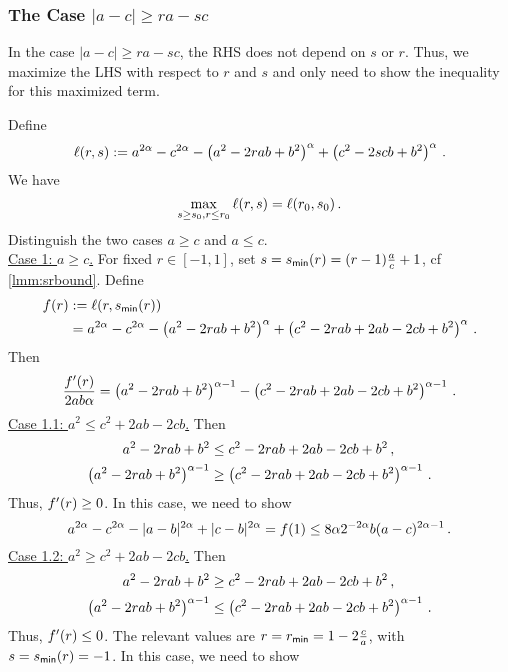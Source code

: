 \subsubsection{The Case $|a-c| \geq ra-sc$}\label{ssec:acgreasc}
%
In the case $|a-c| \geq ra-sc$, the RHS does not depend on $s$ or $r$. Thus, we maximize the LHS with respect to $r$ and $s$ and only need to show the inequality for this maximized term.

Define
\begin{equation*}
	\ell(r,s) := a^{2\alpha}-c^{2\alpha}-\left( a^2-2rab+b^2 \right)^\alpha+\left( c^2-2scb+b^2 \right)^\alpha 
	\, .
\end{equation*}
We have
\begin{equation*}
	\max_{s\geq s_0, r\leq r_0} \ell(r,s) = \ell(r_0,s_0)
	\, .
\end{equation*}
Distinguish the two cases $a\geq c$ and $a\leq c$.\\
\underline{Case 1: $a\geq c$.} For fixed $r\in[-1,1]$, set $s = s_{\mathsf{min}}(r) = (r-1) \frac ac+1$, cf \autoref{lmm:srbound}. Define
\begin{align*}
	f(r) &:= \ell(r,s_{\mathsf{min}}(r)) 
	\\&= a^{2\alpha}-c^{2\alpha}-\left( a^2-2rab+b^2 \right)^\alpha+\left( c^2-2rab+2ab-2cb+b^2 \right)^\alpha
	\, .
\end{align*}
Then
\begin{equation*}
	\frac{f^\prime(r)}{2ab\alpha} = \left( a^2-2rab+b^2 \right)^{\alpha-1} - \left( c^2-2rab+2ab-2cb+b^2 \right)^{\alpha-1}
	\, .
\end{equation*}
\underline{Case 1.1: $a^2 \leq c^2+2ab-2cb$.} Then
\begin{align*}
	a^2-2rab+b^2 &\leq c^2-2rab+2ab-2cb+b^2\, ,\\
	\left( a^2-2rab+b^2 \right)^{\alpha-1} &\geq \left( c^2-2rab+2ab-2cb+b^2 \right)^{\alpha-1}
	\, .
\end{align*}
Thus, $f^\prime(r)\geq0$. In this case, we need to show
\begin{equation*}
	a^{2\alpha}-c^{2\alpha}-|a-b|^{2\alpha}+|c-b|^{2\alpha} = f(1) \leq 8\alpha 2^{-2\alpha} b (a-c)^{2\alpha-1}
	\, .
\end{equation*}
\underline{Case 1.2: $a^2 \geq c^2+2ab-2cb$.} Then
\begin{align*}
	a^2-2rab+b^2 &\geq c^2-2rab+2ab-2cb+b^2\, ,\\
	\left( a^2-2rab+b^2 \right)^{\alpha-1} &\leq \left( c^2-2rab+2ab-2cb+b^2 \right)^{\alpha-1}\, .
\end{align*}
Thus, $f^\prime(r)\leq0$. The relevant values are $r = r_{\mathsf{min}} = 1-2\frac ca$, with $s = s_{\mathsf{min}}(r) = -1$. In this case, we need to show
